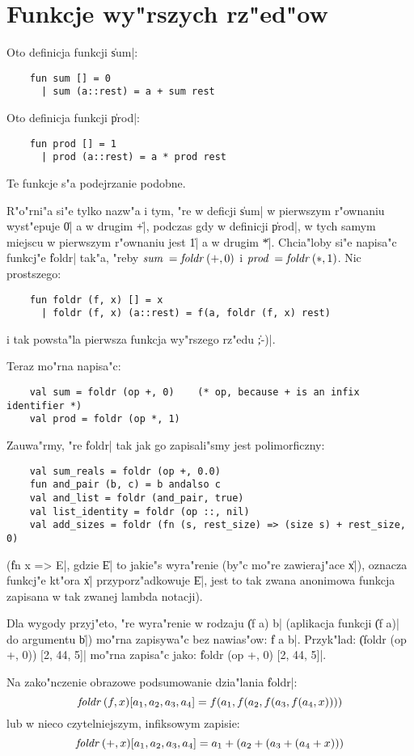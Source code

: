 \chapter{
Funkcje wy"rszych rz"ed"ow
}

Oto definicja funkcji \|sum|:
\begin{verbatim}
    fun sum [] = 0
      | sum (a::rest) = a + sum rest  
\end{verbatim}
Oto definicja funkcji \|prod|:
\begin{verbatim}
    fun prod [] = 1
      | prod (a::rest) = a * prod rest    
\end{verbatim}
Te funkcje s"a podejrzanie podobne.

R"o"rni"a si"e tylko nazw"a i tym, "re w deficji \|sum| 
w pierwszym r"ownaniu wyst"epuje \|0| a w drugim \|+|,
podczas gdy w definicji \|prod|, w tych samym miejscu 
w pierwszym r"ownaniu jest \|1| a w drugim \|*|.
Chcia"loby si"e napisa"c funkcj"e \|foldr| tak"a, "reby
$\f{sum} = \f{foldr} (+, 0)$ i $\f{prod} = \f{foldr} (*, 1)$.
Nic prostszego:
\begin{verbatim}
    fun foldr (f, x) [] = x 
      | foldr (f, x) (a::rest) = f(a, foldr (f, x) rest)
\end{verbatim}
i tak powsta"la pierwsza funkcja wy"rszego rz"edu \|;-)|.

Teraz mo"rna napisa"c:
\begin{verbatim}
    val sum = foldr (op +, 0)    (* op, because + is an infix identifier *)
    val prod = foldr (op *, 1)
\end{verbatim}
Zauwa"rmy, "re \|foldr| tak jak go zapisali"smy jest polimorficzny:
\begin{verbatim}
    val sum_reals = foldr (op +, 0.0)
    fun and_pair (b, c) = b andalso c
    val and_list = foldr (and_pair, true)
    val list_identity = foldr (op ::, nil)
    val add_sizes = foldr (fn (s, rest_size) => (size s) + rest_size, 0)
\end{verbatim}
(\|fn x => E|, gdzie \|E| to jakie"s wyra"renie (by"c mo"re zawieraj"ace \|x|), 
oznacza funkcj"e kt"ora \|x| przyporz"adkowuje \|E|,
jest to tak zwana anonimowa funkcja zapisana w tak zwanej lambda notacji).

Dla wygody przyj"eto, "re wyra"renie w rodzaju \|(f a) b| (aplikacja funkcji
 \|(f a)| do argumentu \|b|)
mo"rna zapisywa"c bez nawias"ow: \|f a b|.
Przyk"lad: \|(foldr (op +, 0)) [2, 44, 5]|
mo"rna zapisa"c jako: \|foldr (op +, 0) [2, 44, 5]|.

Na zako"nczenie obrazowe podsumowanie dzia"lania \|foldr|:
$$\f{foldr} (f, x) [a_1, a_2, a_3, a_4] = f(a_1, f(a_2, f(a_3, f(a_4, x))))$$
lub w nieco czytelniejszym, infiksowym zapisie:
$$\f{foldr} (+, x) [a_1, a_2, a_3, a_4] = a_1 + (a_2 + (a_3 + (a_4 + x)))$$


